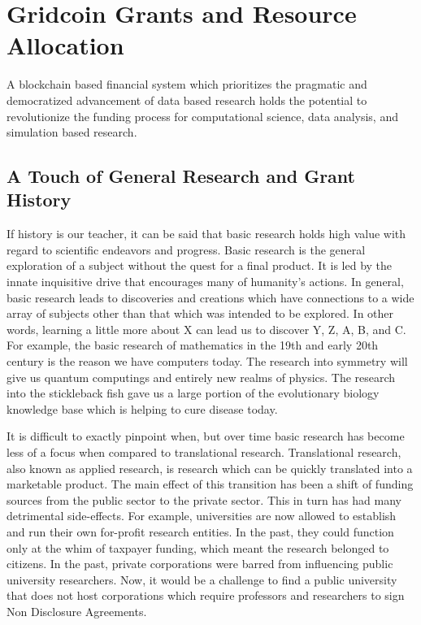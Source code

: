 \section{Gridcoin Grants and Resource Allocation}

\label{sec:grants}

A blockchain based financial system which prioritizes the pragmatic and democratized advancement of data based research holds the potential to revolutionize the funding process for computational science, data analysis, and simulation based research.

\subsection{A Touch of General Research and Grant History}

If history is our teacher, it can be said that basic research holds high value with regard to scientific endeavors and progress.  Basic research is the general exploration of a subject without the quest for a final product.  It is led by the innate inquisitive drive that encourages many of humanity’s actions.  In general, basic research leads to discoveries and creations which have connections to a wide array of subjects other than that which was intended to be explored.  In other words, learning a little more about X can lead us to discover Y, Z, A, B, and C.  For example, the basic research of mathematics in the 19th and early 20th century is the reason we have computers today.  The research into symmetry will give us quantum computings and entirely new realms of physics.  The research into the stickleback fish gave us a large portion of the evolutionary biology knowledge base which is helping to cure disease today.

It is difficult to exactly pinpoint when, but over time basic research has become less of a focus when compared to translational research.  Translational research, also known as applied research, is research which can be quickly translated into a marketable product.  The main effect of this transition has been a shift of funding sources from the public sector to the private sector.  This in turn has had many detrimental side-effects.  For example, universities are now allowed to establish and run their own for-profit research entities.  In the past, they could function only at the whim of taxpayer funding, which meant the research belonged to citizens.  In the past, private corporations were barred from influencing public university researchers.  Now, it would be a challenge to find a public university that does not host corporations which require professors and researchers to sign Non Disclosure Agreements.

